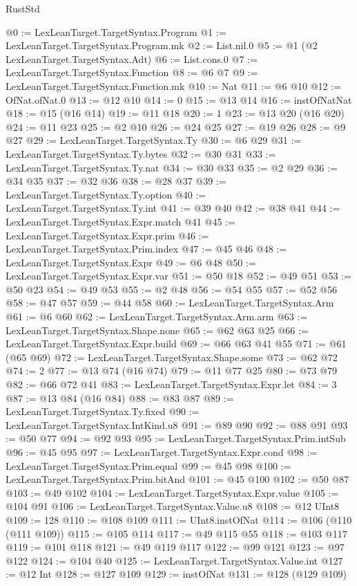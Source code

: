 \begin{lexlean}{RustStd}
\begin{coremodule}
{\begin{coremodule}
{{{{{@0 := LexLeanTarget.TargetSyntax.Program
@1 := LexLeanTarget.TargetSyntax.Program.mk
@2 := List.nil.{0}
@5 := @1 (@2 LexLeanTarget.TargetSyntax.Adt)
@6 := List.cons.{0}
@7 := LexLeanTarget.TargetSyntax.Function
@8 := @6 @7
@9 := LexLeanTarget.TargetSyntax.Function.mk
@10 := Nat
@11 := @6 @10
@12 := OfNat.ofNat.{0}
@13 := @12 @10
@14 := 0
@15 := @13 @14
@16 := instOfNatNat
@18 := @15 (@16 @14)
@19 := @11 @18
@20 := 1
@23 := @13 @20 (@16 @20)
@24 := @11 @23
@25 := @2 @10
@26 := @24 @25
@27 := @19 @26
@28 := @9 @27
@29 := LexLeanTarget.TargetSyntax.Ty
@30 := @6 @29
@31 := LexLeanTarget.TargetSyntax.Ty.bytes
@32 := @30 @31
@33 := LexLeanTarget.TargetSyntax.Ty.nat
@34 := @30 @33
@35 := @2 @29
@36 := @34 @35
@37 := @32 @36
@38 := @28 @37
@39 := LexLeanTarget.TargetSyntax.Ty.option
@40 := LexLeanTarget.TargetSyntax.Ty.int
@41 := @39 @40
@42 := @38 @41
@44 := LexLeanTarget.TargetSyntax.Expr.match @41
@45 := LexLeanTarget.TargetSyntax.Expr.prim
@46 := LexLeanTarget.TargetSyntax.Prim.index
@47 := @45 @46
@48 := LexLeanTarget.TargetSyntax.Expr
@49 := @6 @48
@50 := LexLeanTarget.TargetSyntax.Expr.var
@51 := @50 @18
@52 := @49 @51
@53 := @50 @23
@54 := @49 @53
@55 := @2 @48
@56 := @54 @55
@57 := @52 @56
@58 := @47 @57
@59 := @44 @58
@60 := LexLeanTarget.TargetSyntax.Arm
@61 := @6 @60
@62 := LexLeanTarget.TargetSyntax.Arm.arm
@63 := LexLeanTarget.TargetSyntax.Shape.none
@65 := @62 @63 @25
@66 := LexLeanTarget.TargetSyntax.Expr.build
@69 := @66 @63 @41 @55
@71 := @61 (@65 @69)
@72 := LexLeanTarget.TargetSyntax.Shape.some
@73 := @62 @72
@74 := 2
@77 := @13 @74 (@16 @74)
@79 := @11 @77 @25
@80 := @73 @79
@82 := @66 @72 @41
@83 := LexLeanTarget.TargetSyntax.Expr.let
@84 := 3
@87 := @13 @84 (@16 @84)
@88 := @83 @87
@89 := LexLeanTarget.TargetSyntax.Ty.fixed
@90 := LexLeanTarget.TargetSyntax.IntKind.u8
@91 := @89 @90
@92 := @88 @91
@93 := @50 @77
@94 := @92 @93
@95 := LexLeanTarget.TargetSyntax.Prim.intSub
@96 := @45 @95
@97 := LexLeanTarget.TargetSyntax.Expr.cond
@98 := LexLeanTarget.TargetSyntax.Prim.equal
@99 := @45 @98
@100 := LexLeanTarget.TargetSyntax.Prim.bitAnd
@101 := @45 @100
@102 := @50 @87
@103 := @49 @102
@104 := LexLeanTarget.TargetSyntax.Expr.value
@105 := @104 @91
@106 := LexLeanTarget.TargetSyntax.Value.u8
@108 := @12 UInt8
@109 := 128
@110 := @108 @109
@111 := UInt8.instOfNat
@114 := @106 (@110 (@111 @109))
@115 := @105 @114
@117 := @49 @115 @55
@118 := @103 @117
@119 := @101 @118
@121 := @49 @119 @117
@122 := @99 @121
@123 := @97 @122
@124 := @104 @40
@125 := LexLeanTarget.TargetSyntax.Value.int
@127 := @12 Int
@128 := @127 @109
@129 := instOfNat
@131 := @128 (@129 @109)
}}}}}
\end{coremodule}}
\end{coremodule}
\end{lexlean}
